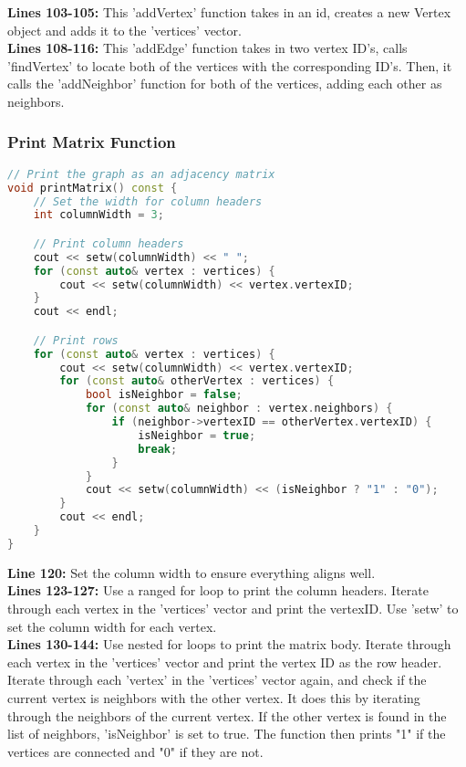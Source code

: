 \documentclass[letterpaper, 10pt,DIV=13]{scrartcl}
\numberwithin{equation}{section} %
\numberwithin{figure}{section} %
\numberwithin{table}{section} %
\begin{document}
\textbf{Lines 103-105:} This 'addVertex' function takes in an id, creates a new Vertex object and adds it to the 'vertices' vector. \\
\textbf{Lines 108-116:} This 'addEdge' function takes in two vertex ID's, calls 'findVertex' to locate both of the vertices with the corresponding ID's. Then, it calls the 'addNeighbor' function for both of the vertices, adding each other as neighbors.


\subsubsection{Print Matrix Function}
\begin{linenumbers}
\begin{lstlisting}[language=C++, caption={Print Matrix Function}, label={code:example}]
// Print the graph as an adjacency matrix
void printMatrix() const {
    // Set the width for column headers
    int columnWidth = 3;

    // Print column headers
    cout << setw(columnWidth) << " ";
    for (const auto& vertex : vertices) {
        cout << setw(columnWidth) << vertex.vertexID;
    }
    cout << endl;

    // Print rows
    for (const auto& vertex : vertices) {
        cout << setw(columnWidth) << vertex.vertexID;
        for (const auto& otherVertex : vertices) {
            bool isNeighbor = false;
            for (const auto& neighbor : vertex.neighbors) {
                if (neighbor->vertexID == otherVertex.vertexID) {
                    isNeighbor = true;
                    break;
                }
            }
            cout << setw(columnWidth) << (isNeighbor ? "1" : "0");
        }
        cout << endl;
    }
}

\end{lstlisting}
\end{linenumbers}
\nolinenumbers

\textbf{Line 120:} Set the column width to ensure everything aligns well. \\
\textbf{Lines 123-127:} Use a ranged for loop to print the column headers. Iterate through each vertex in the 'vertices' vector and print the vertexID. Use 'setw' to set the column width for each vertex. \\
\textbf{Lines 130-144:} Use nested for loops to print the matrix body. Iterate through each vertex in the 'vertices' vector and print the vertex ID as the row header. Iterate through each 'vertex' in the 'vertices' vector again, and check if the current vertex is neighbors with the other vertex. It does this by iterating through the neighbors of the current vertex. If the other vertex is found in the list of neighbors, 'isNeighbor' is set to true. The function then prints "1" if the vertices are connected and "0" if they are not.
\end{document}
